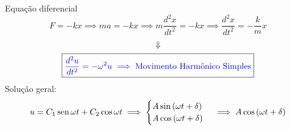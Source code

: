 \begin{frame}{Equação diferencial}
    \[
        F=-kx \implies ma=-kx \implies m\frac{d^2 x}{dt^2}=-kx \implies \frac{d^2 x}{dt^2}=-\frac{k}{m} x
    \]
    \begin{gather*}
    \Downarrow \\
    \boxed{\color{blue} \frac{d^2 u}{dt^2}= -\omega^2 u \implies \text{Movimento Harmônico Simples}}
    \end{gather*}
    Solução geral:
    \[
        u=C_1 \operatorname{sen}{\omega t} + C_2 \cos{\omega t} \implies 
        \begin{cases}
            A \sin{(\omega t + \delta)} \\
            A \cos{(\omega t + \delta)}
        \end{cases}
        \implies A \cos{(\omega t + \delta)}
    \]
\end{frame}

